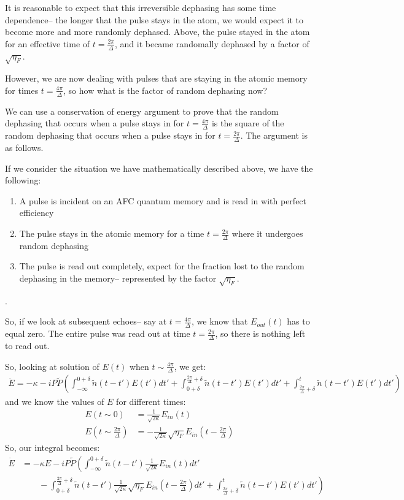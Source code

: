 \documentclass[12pt]{article}
\begin{document}
It is reasonable to expect that this irreversible dephasing has some time dependence-- the longer that the
pulse stays in the atom, we would expect it to become more and more randomly dephased. Above, the pulse
stayed in the atom for an effective time of $t = \frac{2 \pi}{\Delta}$, and it became randomally dephased by
a factor of $\sqrt{\eta_{F}}$.

However, we are now dealing with pulses that are staying in the atomic memory for times $t = \frac{4 \pi}{\Delta}$, so how what is the factor of random dephasing now? 

We can use a conservation of energy argument to prove that the random dephasing that occurs when a pulse stays in for $t=\frac{4 \pi}{\Delta}$ is the square of the random dephasing that occurs when a pulse stays in for $t = \frac{ 2 \pi}{\Delta}$. The argument is as follows.

If we consider the situation we have mathematically described above, we have the following:
\begin{enumerate}
\item A pulse is incident on an AFC quantum memory and is read in with perfect efficiency
\item The pulse stays in the atomic memory for a time $t = \frac{2 \pi}{\Delta}$ where it undergoes random dephasing 
\item The pulse is read out completely, expect for the fraction lost to the random dephasing in the memory-- represented by the factor $\sqrt{\eta_F}$.
\end{enumerate}.

So, if we look at subsequent echoes-- say at $t = \frac{4 \pi}{\Delta}$, we know that $E_{out}(t)$ has to equal zero. The entire pulse was read out at time $t=\frac{2 \pi}{\Delta}$, so there is nothing left to read out. 

So, looking at solution of $E(t)$ when $t\sim \frac{ 4 \pi}{\Delta}$, we get:
\begin{align}
\dot{E} = -\kappa  -i P \tilde{P}\left( \int_{-\infty}^{0+\delta}\tilde{n}(t-t')E(t') dt'+\int^{\frac{2 \pi}{\Delta}+\delta}_{0+\delta} \tilde{n}(t-t') E(t') dt'+ \int^t_{\frac{2 \pi}{\Delta}+\delta} \tilde{n}(t-t') E(t') dt'\right)
\end{align}
and we know the values of $E$ for different times:
\begin{align}
E(t\sim 0) &= \frac{1}{\sqrt{2\kappa}}E_{in}(t)\\
E(t\sim \frac{2 \pi}{\Delta}) &= -\frac{1}{\sqrt{2\kappa}}\sqrt{\eta_{F}} E_{in}(t-\frac{2 \pi}{\Delta})
\end{align}
So, our integral becomes:
\begin{align}
\dot{E} &= -\kappa E  -i P \tilde{P}\left( \int_{-\infty}^{0+\delta}\tilde{n}(t-t') \frac{1}{\sqrt{2\kappa}}E_{in}(t) dt'\right.\\
&\left. \qquad-\int^{\frac{2 \pi}{\Delta}+\delta}_{0+\delta} \tilde{n}(t-t')  \frac{1}{\sqrt{2\kappa}}\sqrt{\eta_{F}} E_{in}(t-\frac{2 \pi}{\Delta}) dt'
+ \int^t_{\frac{2 \pi}{\Delta}+\delta} \tilde{n}(t-t') E(t') dt'\right)
\end{align}
\end{document}
